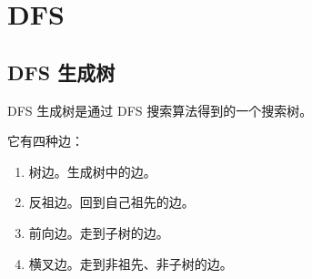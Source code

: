 \section{DFS}
\subsection{DFS 生成树} \label{subsec:DFS生成树}
DFS 生成树是通过 DFS 搜索算法得到的一个搜索树。

它有四种边：
\begin{enumerate}
    \item 树边。生成树中的边。
    \item 反祖边。回到自己祖先的边。
    \item 前向边。走到子树的边。
    \item 横叉边。走到非祖先、非子树的边。
\end{enumerate}
